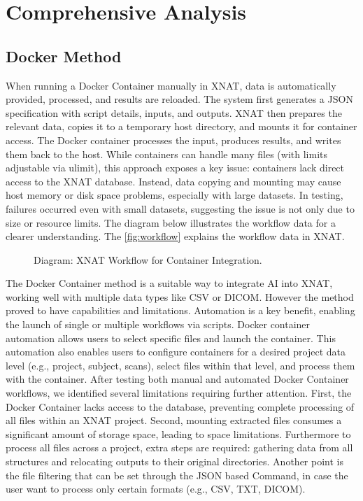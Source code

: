 \chapter{Comprehensive Analysis}
\section{Docker Method}

When running a Docker Container manually in XNAT, data is automatically provided, processed, and results are reloaded. The system first generates a JSON specification with script details, inputs, and outputs. XNAT then prepares the relevant data, copies it to a temporary host directory, and mounts it for container access. The Docker container processes the input, produces results, and writes them back to the host.
While containers can handle many files (with limits adjustable via ulimit), this approach exposes a key issue: containers lack direct access to the XNAT database. Instead, data copying and mounting may cause host memory or disk space problems, especially with large datasets. In testing, failures occurred even with small datasets, suggesting the issue is not only due to size or resource limits.
The diagram below illustrates the workflow data for a clearer understanding.  
The \autoref{fig:workflow} explains the workflow data in XNAT.

\begin{figure}[H]
    \centering
    \def\svgwidth{\linewidth} 
    
    \caption{Diagram: XNAT Workflow for Container Integration.}
    \label{fig:workflow}
\end{figure}



The Docker Container method is a suitable way to integrate AI into XNAT, working well with multiple data types like CSV or DICOM. However the method proved to have capabilities and limitations.
Automation is a key benefit, enabling the launch of single or multiple workflows via scripts. Docker container automation allows users to select specific files and launch the container. This automation also enables users to configure containers for a desired project data level (e.g., project, subject, scans), select files within that level, and process them with the container.
After testing both manual and automated Docker Container workflows, we identified several limitations requiring further attention. First, the Docker Container lacks access to the database, preventing complete processing of all files within an XNAT project. Second, mounting extracted files consumes a significant amount of storage space, leading to space limitations.
Furthermore to process all files across a project, extra steps are required: gathering data from all structures and relocating outputs to their original directories.
Another point is the file filtering that can be set through the JSON based Command, in case the user want to process only certain formats (e.g., CSV, TXT, DICOM).

